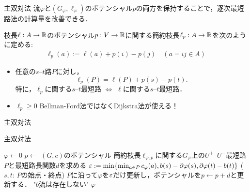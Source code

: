 \documentclass[14pt,aspectratio=169,xcolor=dvipsnames,table,onlytextwidth,dvipdfmx]{beamer}
\begin{document}
\begin{frame}{主双対法}
    \small
    流$\varphi$と$(G_\varphi, \ell_\varphi)$のポテンシャル$p$の両方を保持することで，逐次最短路法の計算量を改善できる．

    \begin{definition}[簡約枝長 (復習)]
        枝長$\ell: A \to \mathbb{R}$のポテンシャル$p: V \to \mathbb{R}$に関する\alert{簡約枝長}$\ell_p: A \to \mathbb{R}$を次のように定める:
        \begin{align*}
       \ell_p(a) := \ell(a) + p(i) - p(j) \quad (a = ij \in A) 
        \end{align*}
    \end{definition}

    \bigskip
    \begin{itemize}
        \item 
    任意の$s$--$t$路$P$に対し，
    \[
        \ell_p(P) = \ell(P) + p(s) - p(t).
    \]
    特に，$\ell_p$に関する$s$--$t$最短路 $\iff$ $\ell$に関する$s$--$t$最短路．
        \item $\ell_p \geq 0$ \dotfill\alert{Bellman-Ford法ではなくDijkstra法が使える！}
    \end{itemize}
\end{frame}

\begin{frame}{主双対法}
    
    \small
    \begin{block}{主双対法}
        \begin{algorithmic}[1]
            \STATE $\varphi \gets 0$ 
            \STATE $p \gets$ $(G, c)$のポテンシャル 
                \STATE 簡約枝長$\ell_{\varphi,p}$に関する$G_\varphi$上の$U^+$--$U^-$最短路$P$と最短路長関数$d$を求める 
                \STATE $\varepsilon := \min\{\min_{a \in P} c_\varphi (a), b(s) - \partial\varphi(s), \partial\varphi(t) - b(t)\}$ \quad ({\footnotesize $s, t$: $P$の始点・終点})
                \STATE $P$に沿って$\varphi$を$\varepsilon$だけ更新し，ポテンシャルを$p \gets p + d$と更新する．
            \ELSE
                \RETURN "$b$流は存在しない"
            \ENDIF
            \ENDWHILE
            \RETURN $\varphi$
        \end{algorithmic}
    \end{block}
\end{frame}
\end{document}
